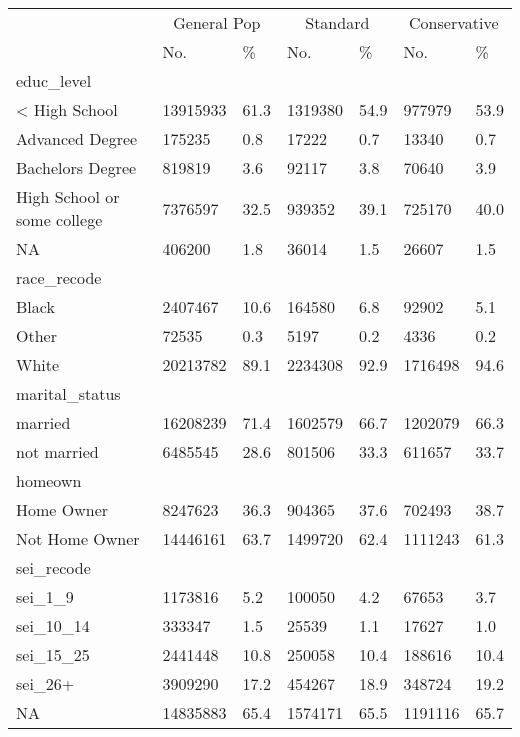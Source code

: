\captionsetup[table]{labelformat=empty,skip=1pt}
\begin{longtable}{lllllll}
\toprule
& \multicolumn{2}{c}{General Pop} & \multicolumn{2}{c}{Standard} & \multicolumn{2}{c}{Conservative} \\ 
 \cmidrule(lr){2-3}\cmidrule(lr){4-5}\cmidrule(lr){6-7}
 & No. & \% & No. & \% & No. & \% \\ 
\midrule
\multicolumn{1}{l}{educ\_level} \\ 
\midrule
< High School & 13915933 & 61.3 & 1319380 & 54.9 & 977979 & 53.9 \\ 
Advanced Degree & 175235 & 0.8 & 17222 & 0.7 & 13340 & 0.7 \\ 
Bachelors Degree & 819819 & 3.6 & 92117 & 3.8 & 70640 & 3.9 \\ 
High School or some college & 7376597 & 32.5 & 939352 & 39.1 & 725170 & 40.0 \\ 
NA & 406200 & 1.8 & 36014 & 1.5 & 26607 & 1.5 \\ 
\midrule
\multicolumn{1}{l}{race\_recode} \\ 
\midrule
Black & 2407467 & 10.6 & 164580 & 6.8 & 92902 & 5.1 \\ 
Other & 72535 & 0.3 & 5197 & 0.2 & 4336 & 0.2 \\ 
White & 20213782 & 89.1 & 2234308 & 92.9 & 1716498 & 94.6 \\ 
\midrule
\multicolumn{1}{l}{marital\_status} \\ 
\midrule
married & 16208239 & 71.4 & 1602579 & 66.7 & 1202079 & 66.3 \\ 
not married & 6485545 & 28.6 & 801506 & 33.3 & 611657 & 33.7 \\ 
\midrule
\multicolumn{1}{l}{homeown} \\ 
\midrule
Home Owner & 8247623 & 36.3 & 904365 & 37.6 & 702493 & 38.7 \\ 
Not Home Owner & 14446161 & 63.7 & 1499720 & 62.4 & 1111243 & 61.3 \\ 
\midrule
\multicolumn{1}{l}{sei\_recode} \\ 
\midrule
sei\_1\_9 & 1173816 & 5.2 & 100050 & 4.2 & 67653 & 3.7 \\ 
sei\_10\_14 & 333347 & 1.5 & 25539 & 1.1 & 17627 & 1.0 \\ 
sei\_15\_25 & 2441448 & 10.8 & 250058 & 10.4 & 188616 & 10.4 \\ 
sei\_26+ & 3909290 & 17.2 & 454267 & 18.9 & 348724 & 19.2 \\ 
NA & 14835883 & 65.4 & 1574171 & 65.5 & 1191116 & 65.7 \\ 

\end{longtable}
